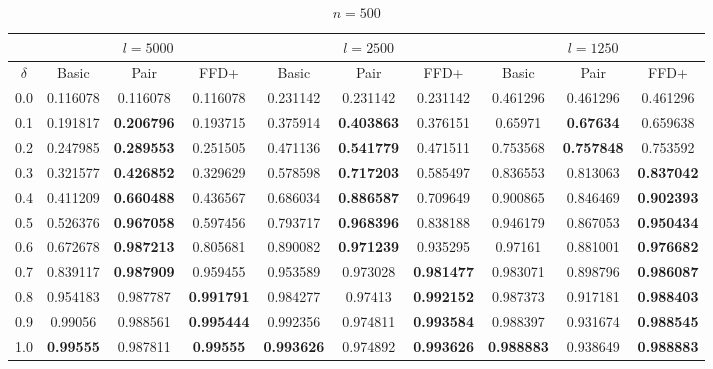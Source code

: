 \documentclass[oribibl]{llncs}
\begin{document}
\begin{table}[!htb]
	\centering
	\caption{$n = 500$}
	\begin{tabular}{c@{\hspace{15pt}}c@{\hspace{10pt}}c@{\hspace{10pt}}c@{\hspace{7pt}}| @{\hspace{7pt}}c@{\hspace{10pt}}c@{\hspace{10pt}}c@{\hspace{7pt}}| @{\hspace{7pt}} c@{\hspace{10pt}}c@{\hspace{10pt}}c}
		\noalign{\smallskip}
		& \multicolumn{3}{c}{$l = 5000$} & \multicolumn{3}{c}{$l = 2500$} & \multicolumn{3}{c}{$l = 1250$} \\
		\hline\noalign{\smallskip}
		$\delta$ & Basic & Pair & FFD+ & Basic & Pair & FFD+ & Basic & Pair & FFD+ \\
		\noalign{\smallskip}
		\hline
		\noalign{\smallskip}
		0.0 & 0.116078 & 0.116078 &	0.116078 & 0.231142 & 0.231142 & 0.231142 & 0.461296 & 0.461296 & 0.461296 \\
		0.1 & 0.191817 & \textbf{0.206796} & 0.193715 & 0.375914 & \textbf{0.403863} & 0.376151 & 0.65971 & \textbf{0.67634} & 0.659638 \\
		0.2	& 0.247985 & \textbf{0.289553} & 0.251505 & 0.471136 & \textbf{0.541779} & 0.471511 & 0.753568 & \textbf{0.757848} & 0.753592 \\
		0.3	& 0.321577 & \textbf{0.426852} & 0.329629 & 0.578598 & \textbf{0.717203} & 0.585497 & 0.836553 & 0.813063 & \textbf{0.837042} \\
		0.4	& 0.411209 & \textbf{0.660488} & 0.436567 & 0.686034 & \textbf{0.886587} & 0.709649 & 0.900865 & 0.846469 & \textbf{0.902393} \\
		0.5	& 0.526376 & \textbf{0.967058} & 0.597456 & 0.793717 & \textbf{0.968396} & 0.838188 & 0.946179 & 0.867053 & \textbf{0.950434} \\
		0.6	& 0.672678 & \textbf{0.987213} & 0.805681 & 0.890082 & \textbf{0.971239} & 0.935295 & 0.97161 & 0.881001 & \textbf{0.976682} \\
		0.7	& 0.839117 & \textbf{0.987909} & 0.959455 & 0.953589 & 0.973028 & \textbf{0.981477} & 0.983071 & 0.898796 & \textbf{0.986087} \\
		0.8	& 0.954183 & 0.987787 &	\textbf{0.991791} & 0.984277 & 0.97413 & \textbf{0.992152} & 0.987373 & 0.917181 & \textbf{0.988403} \\
		0.9	& 0.99056 &	0.988561 & \textbf{0.995444} & 0.992356 & 0.974811 & \textbf{0.993584} & 0.988397 & 0.931674 & \textbf{0.988545} \\
		1.0	& \textbf{0.99555} & 0.987811 & \textbf{0.99555} & \textbf{0.993626} & 0.974892 & \textbf{0.993626} & \textbf{0.988883} & 0.938649 & \textbf{0.988883} \\
		\hline
	\end{tabular}
	\label{table:n500}
\end{table}	
\end{document}
